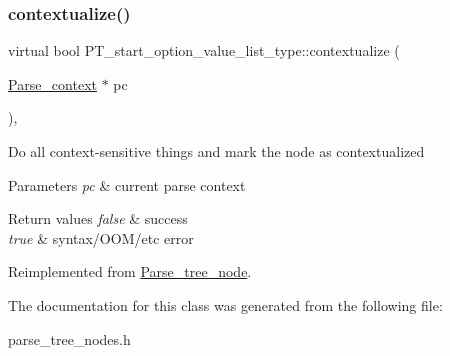 \subsubsection{\texorpdfstring{contextualize()}{contextualize()}}
{\footnotesize\ttfamily virtual bool P\+T\+\_\+start\+\_\+option\+\_\+value\+\_\+list\+\_\+type\+::contextualize (\begin{DoxyParamCaption}\item[{\mbox{\hyperlink{structParse__context}{Parse\+\_\+context}} $\ast$}]{pc }\end{DoxyParamCaption})\hspace{0.3cm}{\ttfamily [inline]}, {\ttfamily [virtual]}}

Do all context-\/sensitive things and mark the node as contextualized


\begin{DoxyParams}{Parameters}
{\em pc} & current parse context\\
\hline
\end{DoxyParams}

\begin{DoxyRetVals}{Return values}
{\em false} & success \\
\hline
{\em true} & syntax/\+O\+O\+M/etc error \\
\hline
\end{DoxyRetVals}


Reimplemented from \mbox{\hyperlink{classParse__tree__node_a22d93524a537d0df652d7efa144f23da}{Parse\+\_\+tree\+\_\+node}}.



The documentation for this class was generated from the following file\+:\begin{DoxyCompactItemize}
\item 
parse\+\_\+tree\+\_\+nodes.\+h\end{DoxyCompactItemize}
